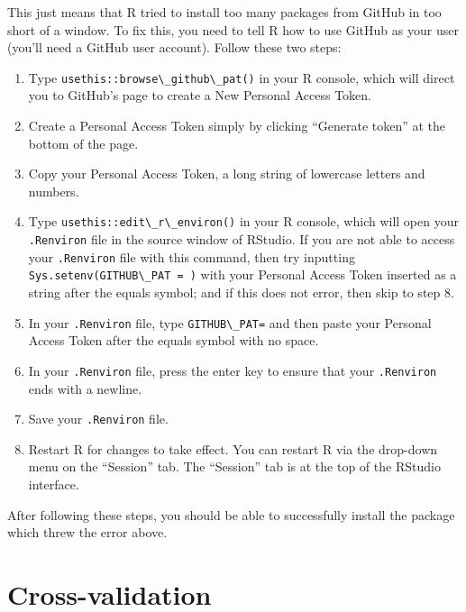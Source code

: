\documentclass[
  12pt, krantz2,
]{krantz}
\newcommand{\passthrough}[1]{#1}
\providecommand{\tightlist}{%
  \setlength{\itemsep}{0pt}\setlength{\parskip}{0pt}}
\theoremstyle{definition}
\theoremstyle{definition}
\theoremstyle{definition}
\newcommand{\1}{\mathbbm{1}}
\begin{document}
This just means that R tried to install too many packages from GitHub in too short of a window. To fix this, you need to tell R how to use GitHub as your user (you'll need a GitHub user account). Follow these two steps:

\begin{enumerate}
\def\labelenumi{\arabic{enumi}.}
\tightlist
\item
  Type \passthrough{\lstinline!usethis::browse\_github\_pat()!} in your R console, which will direct you to GitHub's page to create a New Personal Access Token.
\item
  Create a Personal Access Token simply by clicking ``Generate token'' at the bottom of the page.
\item
  Copy your Personal Access Token, a long string of lowercase letters and numbers.
\item
  Type \passthrough{\lstinline!usethis::edit\_r\_environ()!} in your R console, which will open your \passthrough{\lstinline!.Renviron!} file in the source window of RStudio. If you are not able to access your \passthrough{\lstinline!.Renviron!} file with this command, then try inputting \passthrough{\lstinline!Sys.setenv(GITHUB\_PAT = )!} with your Personal Access Token inserted as a string after the equals symbol; and if this does not error, then skip to step 8.
\item
  In your \passthrough{\lstinline!.Renviron!} file, type \passthrough{\lstinline!GITHUB\_PAT=!} and then paste your Personal Access Token after the equals symbol with no space.
\item
  In your \passthrough{\lstinline!.Renviron!} file, press the enter key to ensure that your \passthrough{\lstinline!.Renviron!} ends with a newline.
\item
  Save your \passthrough{\lstinline!.Renviron!} file.
\item
  Restart R for changes to take effect. You can restart R via the drop-down menu on the ``Session'' tab. The ``Session'' tab is at the top of the RStudio interface.
\end{enumerate}

After following these steps, you should be able to successfully install the package which threw the error above.

\hypertarget{origami}{%
\chapter{Cross-validation}\label{origami}}
\end{document}
